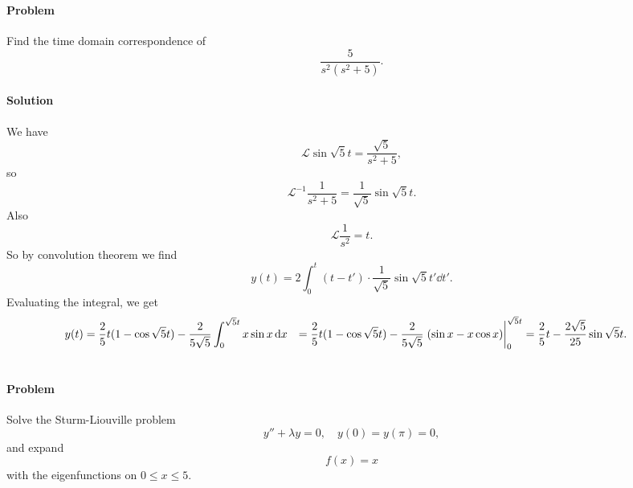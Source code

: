\documentclass[hyperref, a4paper]{article}
\def\\{}%
\newcommand*{\laplace}{\mathcal{L}}
\newcommand*{\invlaplace}{\mathcal{L}^{-1}}
\begin{document}
\section{}

\paragraph*{Problem} Find the time domain correspondence of 
\[
    \frac{5}{s^2 (s^2 + 5)}.
\]

\paragraph*{Solution} We have 
\[
    \laplace \sin \sqrt{5} t = \frac{\sqrt{5}}{s^2 + 5},
\]
so 
\[
    \invlaplace \frac{1}{s^2 + 5} = \frac{1}{\sqrt{5}} \sin \sqrt{5} t.
\]
Also 
\[
    \laplace \frac{1}{s^2} = t.
\]
So by convolution theorem we find 
\[
    y(t) = 2 \int_{0}^{t} (t - t') \cdot \frac{1}{\sqrt{5}} \sin \sqrt{5} t' \dd{t'}.
\]
Evaluating the integral, we get 
\begin{equation}
    \begin{aligned}
        y(t) &= \frac{2}{5} t (1 - \cos \sqrt{5} t) 
        - \frac{2}{5 \sqrt{5}} \int_{0}^{\sqrt{5} t} x \sin x \dd{x} \\
        &= \frac{2}{5} t (1 - \cos \sqrt{5} t) 
        - \frac{2}{5 \sqrt{5}} \eval{(\sin x - x \cos x)}_{0}^{\sqrt{5} t} \\
        &= \frac{2}{5} t - \frac{2\sqrt{5}}{25} \sin \sqrt{5} t.
    \end{aligned}
\end{equation}

\section{}

\paragraph*{Problem} Solve the Sturm-Liouville problem 
\begin{equation}
    y'' + \lambda y = 0, \quad y(0) = y(\pi) = 0,
    \label{eq:4.1}
\end{equation}
and expand 
\begin{equation}
    f(x) = x
\end{equation}
with the eigenfunctions on $0 \leq x \leq 5$.
\end{document}
